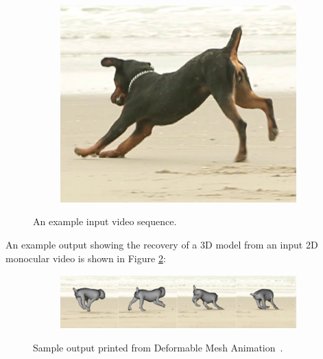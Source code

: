 \begin{figure}[H]
\begin{subfigure}{0.33\textwidth}
        \centering
            \includegraphics[width=1\linewidth]{input/208}
        \end{subfigure}%
        \caption{An example input video sequence.}
        \label{fig:arap_input}
    \end{figure}

    An example output showing the recovery of a 3D model from an input 2D monocular video is shown in Figure \ref{fig:intro_arap_output}:
    
    \begin{figure}[H]
        \centering
        \begin{subfigure}{1\textwidth}
        \centering
            \includegraphics[width=1\linewidth]{input/arapsfm_output}
        \end{subfigure}%
        \caption{Sample output printed from Deformable Mesh Animation~\cite{arap_stebbing}.}
        \label{fig:intro_arap_output}
    \end{figure}

